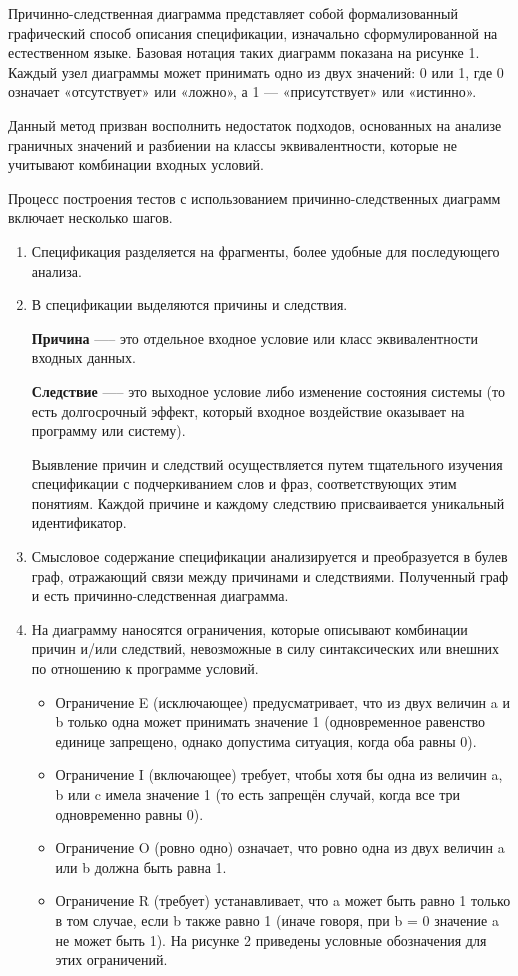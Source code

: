\documentclass{article}[14pt]
\begin{document}
Причинно-следственная диаграмма представляет собой формализованный графический способ описания спецификации, 
изначально сформулированной на естественном языке. Базовая нотация таких диаграмм показана на рисунке 1. Каждый 
узел диаграммы может принимать одно из двух значений: 0 или 1, где 0 означает «отсутствует» или «ложно», а 1 --- 
«присутствует» или «истинно».

Данный метод призван восполнить недостаток подходов, основанных на анализе граничных значений и разбиении на классы 
эквивалентности, которые не учитывают комбинации входных условий.

Процесс построения тестов с использованием причинно-следственных диаграмм включает несколько шагов.

\begin{enumerate}
	\item Спецификация разделяется на фрагменты, более удобные для последующего анализа.
	\item В спецификации выделяются причины и следствия.

	\textbf{Причина} —-- это отдельное входное условие или класс эквивалентности входных данных.

	\textbf{Следствие} —-- это выходное условие либо изменение состояния системы (то есть долгосрочный эффект, который входное 
	воздействие оказывает на программу или систему).

	Выявление причин и следствий осуществляется путем тщательного изучения спецификации с подчеркиванием слов и фраз, 
	соответствующих этим понятиям. Каждой причине и каждому следствию присваивается уникальный идентификатор.

	\item Смысловое содержание спецификации анализируется и преобразуется в булев граф, отражающий связи между 
	причинами и следствиями. Полученный граф и есть причинно-следственная диаграмма.

	\item На диаграмму наносятся ограничения, которые описывают комбинации причин и/или следствий, невозможные в силу 
	синтаксических или внешних по отношению к программе условий.

	\begin{itemize}
		\item Ограничение E (исключающее) предусматривает, что из двух величин a и b только одна может принимать значение 1 
		(одновременное равенство единице запрещено, однако допустима ситуация, когда оба равны 0).
		\item Ограничение I (включающее) требует, чтобы хотя бы одна из величин a, b или c имела значение 1 
		(то есть запрещён случай, когда все три одновременно равны 0).
		\item Ограничение O (ровно одно) означает, что ровно одна из двух величин a или b должна быть равна 1.
		\item Ограничение R (требует) устанавливает, что a может быть равно 1 только в том случае, если b также равно 1 
		(иначе говоря, при b = 0 значение a не может быть 1). На рисунке 2 приведены условные обозначения для этих ограничений.
	\end{itemize}


\end{enumerate}
\end{document}
